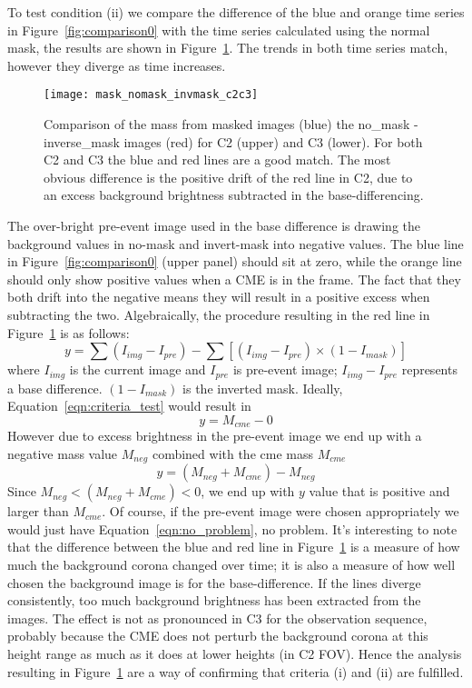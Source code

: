 To test condition (ii) we compare the difference of the blue and orange time series in Figure~\ref{fig:comparison0} with the time series calculated using the normal mask, the results are shown in Figure~\ref{fig:comparison}. The trends in both time series match, however they diverge as time increases. 
\begin{figure}[t!]
\begin{center}
\texttt{[image: mask\_nomask\_invmask\_c2c3]}
\caption{Comparison of the mass from masked images (blue) the no\_mask - inverse\_mask images (red) for C2 (upper) and C3 (lower). For both C2 and C3 the blue and red lines are a good match. The most obvious difference is the positive drift of the red line in C2, due to an excess background brightness subtracted in the base-differencing.}
\label{fig:comparison}
\end{center}
\end{figure}
The over-bright pre-event image used in the base difference is drawing the background values in no-mask and invert-mask into negative values. The blue line in Figure~\ref{fig:comparison0} (upper panel) should sit at zero, while the orange line should only show positive values when a CME is in the frame. The fact that they both drift into the negative means they will result in a positive excess when subtracting the two.
Algebraically, the procedure resulting in the red line in Figure~\ref{fig:comparison} is as follows:
\begin{equation}
y = \sum(I_{img} - I_{pre}) - \sum[(I_{img} - I_{pre})\times (1-I_{mask})]
\label{eqn:criteria_test}
\end{equation}
where $I_{img}$ is the current image and $I_{pre}$ is pre-event image; $I_{img} - I_{pre}$ represents a base difference. $(1-I_{mask})$ is the inverted mask. Ideally, Equation~\ref{eqn:criteria_test} would result in
\begin{equation}
y = M_{cme} - 0
\label{eqn:no_problem}
\end{equation}
However due to excess brightness in the pre-event image we end up with a negative mass value $M_{neg}$ combined with the cme mass $M_{cme}$
\begin{equation}
y = (M_{neg} + M_{cme})  - M_{neg}
\end{equation}
Since $M_{neg} < (M_{neg} + M_{cme}   ) < 0$, we end up with $y$ value that is positive and larger than $M_{cme}$. Of course, if the pre-event image were chosen appropriately we would just have Equation~\ref{eqn:no_problem}, no problem. It's interesting to note that the difference between the blue and red line in Figure~\ref{fig:comparison} is a measure of how much the background corona changed over time; it is also a measure of how well chosen the background image is for the base-difference. If the lines diverge consistently, too much background brightness has been extracted from the images. The effect is not as pronounced in C3 for the observation sequence, probably because the CME does not perturb the background corona at this height range as much as it does at lower heights (in C2 FOV). Hence the analysis resulting in Figure~\ref{fig:comparison} are a way of confirming that criteria (i) and (ii) are fulfilled.


